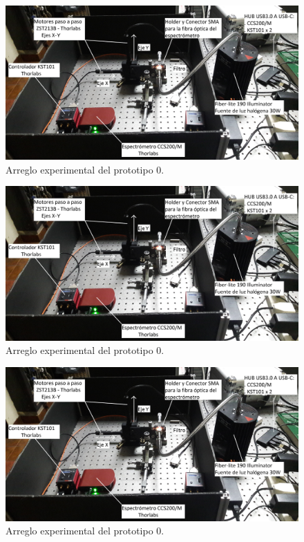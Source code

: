 \begin{figure}[H]
	\centering
	\includegraphics[width=1.0\textwidth]{Figs/microespectrometro/setupbarridooriginal.jpg}
	\caption{Arreglo experimental del prototipo 0.}
	\label{fig:setup0}
\end{figure}

\begin{figure}[H]
	\centering
	\includegraphics[width=1.0\textwidth]{Figs/microespectrometro/setupbarridooriginal.jpg}
	\caption{Arreglo experimental del prototipo 0.}
	\label{fig:setup0}
\end{figure}

\begin{figure}[H]
	\centering
	\includegraphics[width=1.0\textwidth]{Figs/microespectrometro/setupbarridooriginal.jpg}
	\caption{Arreglo experimental del prototipo 0.}
	\label{fig:setup0}
\end{figure}

